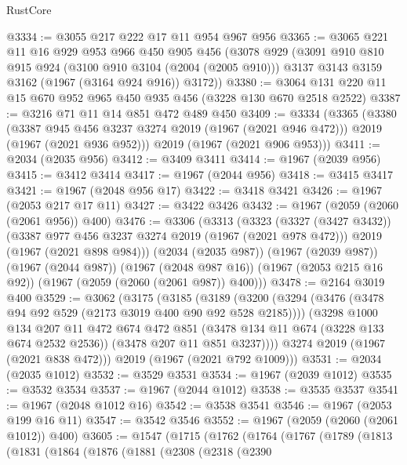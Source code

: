 \begin{lexlean}{RustCore}
\begin{coremodule}
@3334 := @3055 @217 @222 @17 @11 @954 @967 @956
@3365 := @3065
    @221
    @11
    @16
    @929
    @953
    @966
    @450
    @905
    @456
    (@3078
      @929
      (@3091
        @910
        @810
        @915
        @924
        (@3100 @910 @3104 (@2004 (@2005 @910)))
        @3137
        @3143
        @3159
        @3162
        (@1967 (@3164 @924 @916))
        @3172))
@3380 := @3064 @131 @220 @11 @15 @670 @952 @965 @450 @935 @456 (@3228 @130 @670 @2518 @2522)
@3387 := @3216 @71 @11 @14 @851 @472 @489 @450
@3409 := @3334
    (@3365
      (@3380
        (@3387 @945 @456 @3237 @3274 @2019 (@1967 (@2021 @946 @472)))
        @2019
        (@1967 (@2021 @936 @952)))
      @2019
      (@1967 (@2021 @906 @953)))
@3411 := @2034 (@2035 @956)
@3412 := @3409 @3411
@3414 := @1967 (@2039 @956)
@3415 := @3412 @3414
@3417 := @1967 (@2044 @956)
@3418 := @3415 @3417
@3421 := @1967 (@2048 @956 @17)
@3422 := @3418 @3421
@3426 := @1967 (@2053 @217 @17 @11)
@3427 := @3422 @3426
@3432 := @1967 (@2059 (@2060 (@2061 @956)) @400)
@3476 := @3306
    (@3313
      (@3323
        (@3327 (@3427 @3432))
        (@3387 @977 @456 @3237 @3274 @2019 (@1967 (@2021 @978 @472)))
        @2019
        (@1967 (@2021 @898 @984)))
      (@2034 (@2035 @987))
      (@1967 (@2039 @987))
      (@1967 (@2044 @987))
      (@1967 (@2048 @987 @16))
      (@1967 (@2053 @215 @16 @92))
      (@1967 (@2059 (@2060 (@2061 @987)) @400)))
@3478 := @2164 @3019 @400
@3529 := @3062
    (@3175
      (@3185
        (@3189
          (@3200
            (@3294 (@3476 (@3478 @94 @92 @529 (@2173 @3019 @400 @90 @92 @528 @2185))))
            (@3298
              @1000
              @134
              @207
              @11
              @472
              @674
              @472
              @851
              (@3478 @134 @11 @674 (@3228 @133 @674 @2532 @2536))
              (@3478 @207 @11 @851 @3237))))
        @3274
        @2019
        (@1967 (@2021 @838 @472)))
      @2019
      (@1967 (@2021 @792 @1009)))
@3531 := @2034 (@2035 @1012)
@3532 := @3529 @3531
@3534 := @1967 (@2039 @1012)
@3535 := @3532 @3534
@3537 := @1967 (@2044 @1012)
@3538 := @3535 @3537
@3541 := @1967 (@2048 @1012 @16)
@3542 := @3538 @3541
@3546 := @1967 (@2053 @199 @16 @11)
@3547 := @3542 @3546
@3552 := @1967 (@2059 (@2060 (@2061 @1012)) @400)
@3605 := @1547
    (@1715
      (@1762
        (@1764
          (@1767
            (@1789
              (@1813
                (@1831
                  (@1864
                    (@1876
                      (@1881
                        (@2308
                          (@2318
                            (@2390

\end{coremodule}
\end{lexlean}
